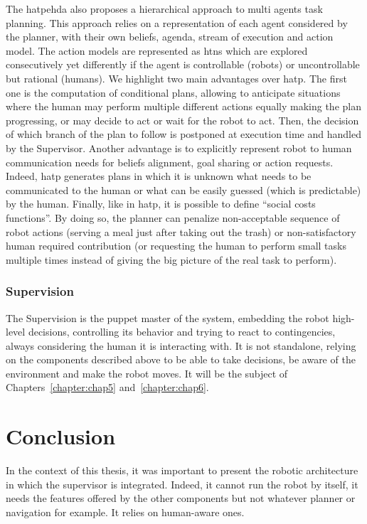 \documentclass[a4paper,11pt,twoside]{StyleThese}
\begin{document}
The \acrfull{hatpehda} also proposes a hierarchical approach to multi agents task planning. This approach relies on a representation of each agent considered by the planner, with their own beliefs, agenda, stream of execution and action model. The action models are represented as \acrshort{htn}s which are explored consecutively yet differently if the agent is controllable (robots) or uncontrollable but rational (humans). We highlight two main advantages over \acrshort{hatp}. The first one is the computation of conditional plans, allowing to anticipate situations where the human may perform multiple different actions equally making the plan progressing, or may decide to act or wait for the robot to act. Then, the decision of which branch of the plan to follow is postponed at execution time and handled by the Supervisor. Another advantage is to explicitly represent robot to human communication needs for beliefs alignment, goal sharing or action requests. Indeed, \acrshort{hatp} generates plans in which it is unknown what needs to be communicated to the human or what can be easily guessed (\ie which is predictable) by the human. Finally, like in \acrshort{hatp}, it is possible to define ``social costs functions''. By doing so, the planner can penalize non-acceptable sequence of robot actions (\eg serving a meal just after taking out the trash) or non-satisfactory human required contribution (\eg or requesting the human to perform small tasks multiple times instead of giving the big picture of the real task to perform).


\subsubsection{Supervision}
The Supervision is the puppet master of the system, embedding the robot high-level decisions, controlling its behavior and trying to react to contingencies, always considering the human it is interacting with. It is not standalone, relying on the components described above to be able to take decisions, be aware of the environment and make the robot moves. It will be the subject of Chapters~\ref{chapter:chap5} and~\ref{chapter:chap6}.

\newpage

\section{Conclusion}

In the context of this thesis, it was important to present the robotic architecture in which the supervisor is integrated. Indeed, it cannot run the robot by itself, it needs the features offered by the other components but not whatever planner or navigation for example. It relies on human-aware ones. 
\end{document}
